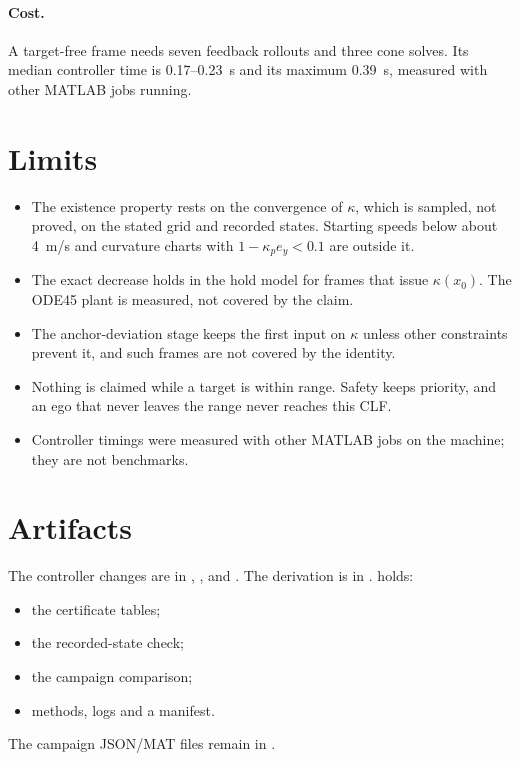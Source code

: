 \documentclass[11pt]{article}
\begin{document}
\paragraph{Cost.} A target-free frame needs seven feedback rollouts and three
cone solves. Its median controller time is 0.17--0.23~s and its maximum
0.39~s, measured with other MATLAB jobs running.

\section{Limits}
\begin{itemize}
\item The existence property rests on the convergence of $\kappa$, which is
sampled, not proved, on the stated grid and recorded states. Starting speeds
below about 4~m/s and curvature charts with $1-\kappa_pe_y<0.1$ are outside
it.
\item The exact decrease holds in the hold model for frames that issue
$\kappa(x_0)$. The ODE45 plant is measured, not covered by the claim.
\item The anchor-deviation stage keeps the first input on $\kappa$ unless other
constraints prevent it, and such frames are not covered by the identity.
\item Nothing is claimed while a target is within range. Safety keeps priority,
and an ego that never leaves the range never reaches this CLF.
\item Controller timings were measured with other MATLAB jobs on the machine;
they are not benchmarks.
\end{itemize}

\section{Artifacts}
The controller changes are in ,
,
 and
. The derivation is in
.
 holds:
\begin{itemize}
\item the certificate tables;
\item the recorded-state check;
\item the campaign comparison;
\item methods, logs and a manifest.
\end{itemize}
The campaign JSON/MAT files remain in
.
\end{document}
